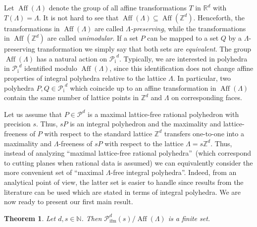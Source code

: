 \documentclass[a4paper]{article}
\theoremstyle{plain}
\newtheorem{theorem}[nn]{Theorem}
\begin{document}
Let ${{\mathop{\mathrm{{Aff}}}}}(\Lambda)$ denote the group of all affine 
transformations $T$ in ${\mathbb{R}}^d$ with $T(\Lambda) =
\Lambda$.
It is not hard to see that ${{\mathop{\mathrm{{Aff}}}}}(\Lambda) \subseteq
{{\mathop{\mathrm{{Aff}}}}}({\mathbb{Z}}^d)$.
Henceforth, the transformations in ${{\mathop{\mathrm{{Aff}}}}}(\Lambda)$ are
called {\emph{{$\Lambda$-preserving}}}, while the
transformations in ${{\mathop{\mathrm{{Aff}}}}}({\mathbb{Z}}^d)$ are called
\emph{unimodular}.
If a set $P$ can be mapped to a set $Q$ by a
$\Lambda$-preserving transformation we simply say that both
sets are \emph{equivalent}.
The group ${{\mathop{\mathrm{{Aff}}}}}(\Lambda)$ has a natural action on ${{\mathcal{P}}_{{\mathop{\mathrm{{i}}}}}}^d$.
Typically, we are interested in polyhedra in ${{\mathcal{P}}_{{\mathop{\mathrm{{i}}}}}}^d$
identified modulo ${{\mathop{\mathrm{{Aff}}}}}(\Lambda)$, since this identification
does not change affine properties of integral polyhedra
relative to the lattice $\Lambda$.
In particular, two polyhedra $P,Q \in {{\mathcal{P}}_{{\mathop{\mathrm{{i}}}}}}^d$ which coincide
up to an affine transformation in ${{\mathop{\mathrm{{Aff}}}}}(\Lambda)$ contain
the same number of lattice points in ${\mathbb{Z}}^d$ and
$\Lambda$ on corresponding faces.

Let us assume that $P \in {\mathcal{P}}^d$ is a maximal lattice-free
rational polyhedron with precision $s$.
Thus, $sP$ is an integral polyhedron and the maximality and
lattice-freeness of $P$ with respect to the standard lattice
${\mathbb{Z}}^d$ transfers one-to-one into a maximality and
$\Lambda$-freeness of $sP$ with respect to the lattice
$\Lambda = s {\mathbb{Z}}^d$.
Thus, instead of analyzing ``maximal lattice-free rational
polyhedra''~(which correspond to cutting planes when
rational data is assumed) we can equivalently consider the
more convenient set of ``maximal $\Lambda$-free integral
polyhedra''.
Indeed, from an analytical point of view, the latter set is
easier to handle since results from the literature can be
used which are stated in terms of integral polyhedra.
We are now ready to present our first main result.

\begin{theorem} \label{finiteness}
Let $d,s \in {\mathbb{N}}$.
Then ${{\mathcal{P}}_{{\mathop{\mathrm{{ifm}}}}}^{{d}}({s})} / {{\mathop{\mathrm{{Aff}}}}}(\Lambda)$ is a finite set.
\end{theorem}
\end{document}
